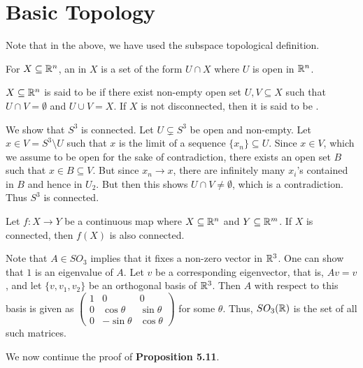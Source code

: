 \section{Basic Topology}

Note that in the above, we have used the subspace topological definition.

\begin{definition}
    For $X \subseteq \mathbb{R}^{n}$, an  in $X$ is a set of the form $U \cap X$ where $U$ is open in $\mathbb{R}^{n}$.
\end{definition}

\begin{definition}
    $X \subseteq \mathbb{R}^{n}$ is said to be  if there exist non-empty open set $U,V \subseteq X$ such that $U \cap V = \emptyset$ and $U \cup V = X$. If $X$ is not disconnected, then it is said to be .
\end{definition}

We show that $S^{3}$ is connected. Let $U \subsetneq S^{3}$ be open and non-empty. Let $x \in V = S^{3}\setminus U$ such that $x$ is the limit of a sequence $\{x_{n}\} \subseteq U$. Since $x \in V$, which we assume to be open for the sake of contradiction, there exists an open set $B$ such that $x \in B \subseteq V$. But since $x_{n} \to x$, there are infinitely many $x_{i}$'s contained in $B$ and hence in $U_{2}$. But then this shows $U \cap V \neq \emptyset$, which is a contradiction. Thus $S^{3}$ is connected.

\begin{proposition}
    Let $f:X \to Y$ be a continuous map where $X \subseteq \mathbb{R}^{n}$ and $Y \subseteq \mathbb{R}^{m}$. If $X$ is connected, then $f(X)$ is also connected.
\end{proposition}

Note that $A \in SO_{3}$ implies that it fixes a non-zero vector in $\mathbb{R}^{3}$. One can show that $1$ is an eigenvalue of $A$. Let $v$ be a corresponding eigenvector, that is, $Av = v$, and let $\{v,v_{1},v_{2}\}$ be an orthogonal basis of $\mathbb{R}^{3}$. Then $A$ with respect to this basis is given as $\begin{pmatrix}
    1 & 0 & 0 \\ 0 & \cos \theta & \sin \theta \\ 0 & -\sin \theta & \cos \theta
\end{pmatrix}$ for some $\theta$. Thus, $SO_{3}(\mathbb{R})$ is the set of all such matrices.

We now continue the proof of \textbf{Proposition 5.11}.

